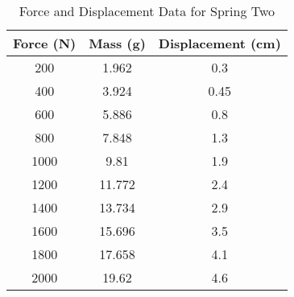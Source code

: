 \begin{table}[H]
	\centering
	\caption{Force and Displacement Data for Spring Two \label{table2}}
	\begin{tabular}{ccc}
		\hline
		\textbf{Force (N)} & \textbf{Mass (g)} & \textbf{Displacement (cm)} \\
		\hline
		200                & 1.962             & 0.3                        \\
		400                & 3.924             & 0.45                       \\
		600                & 5.886             & 0.8                        \\
		800                & 7.848             & 1.3                        \\
		1000               & 9.81              & 1.9                        \\
		1200               & 11.772            & 2.4                        \\
		1400               & 13.734            & 2.9                        \\
		1600               & 15.696            & 3.5                        \\
		1800               & 17.658            & 4.1                        \\
		2000               & 19.62             & 4.6                        \\
		\hline
	\end{tabular}
\end{table}